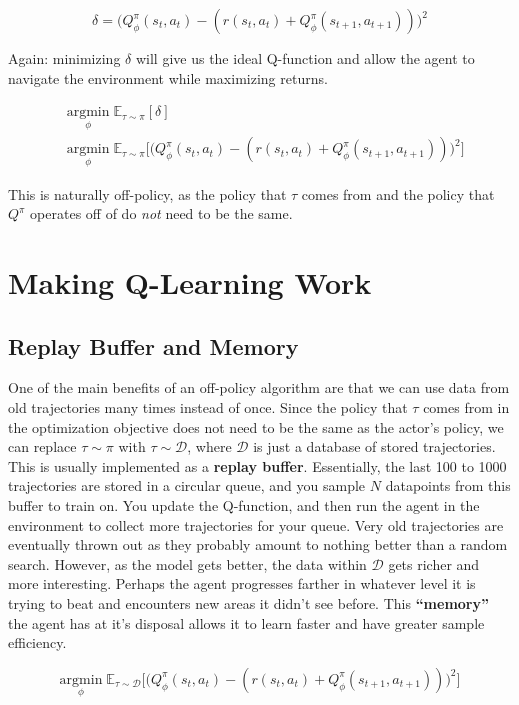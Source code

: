     $$\delta = \biggl(Q_\phi^\pi(s_t, a_t) - (r(s_t, a_t) + Q_\phi^\pi(s_{t+1}, a_{t+1}))\biggr)^2$$
    
    Again: minimizing $\delta$ will give us the ideal Q-function and allow the agent to navigate the environment while maximizing returns.
    
    \begin{align*}
        & \underset{\phi}{\mathrm{argmin}}\;\mathbb{E}_{\tau \sim \pi}[\delta]\\
        & \underset{\phi}{\mathrm{argmin}}\;\mathbb{E}_{\tau \sim \pi}\biggl[\biggl(Q_\phi^\pi(s_t, a_t) - (r(s_t, a_t) + Q_\phi^\pi(s_{t+1}, a_{t+1}))\biggr)^2\biggr]
    \end{align*}
    
    This is naturally off-policy, as the policy that $\tau$ comes from and the policy that $Q^\pi$ operates off of do \textit{not} need to be the same.

\section{Making Q-Learning Work}
\subsection{Replay Buffer and Memory}
    \large One of the main benefits of an off-policy algorithm are that we can use data from old trajectories many times instead of once. Since the policy that $\tau$ comes from in the optimization objective does not need to be the same as the actor's policy, we can replace $\tau \sim \pi$ with $\tau \sim \mathcal{D}$, where $\mathcal{D}$ is just a database of stored trajectories. This is usually implemented as a \textbf{replay buffer}. Essentially, the last 100 to 1000 trajectories are stored in a circular queue, and you sample $N$ datapoints from this buffer to train on. You update the Q-function, and then run the agent in the environment to collect more trajectories for your queue. Very old trajectories are eventually thrown out as they probably amount to nothing better than a random search. However, as the model gets better, the data within $\mathcal{D}$ gets richer and more interesting. Perhaps the agent progresses farther in whatever level it is trying to beat and encounters new areas it didn't see before. This \textbf{``memory''} the agent has at it's disposal allows it to learn faster and have greater sample efficiency.

    $$\underset{\phi}{\mathrm{argmin}}\;\mathbb{E}_{\tau \sim \mathcal{D}}\biggl[\biggl(Q_\phi^\pi(s_t, a_t) - (r(s_t, a_t) + Q_\phi^\pi(s_{t+1}, a_{t+1}))\biggr)^2\biggr]$$

